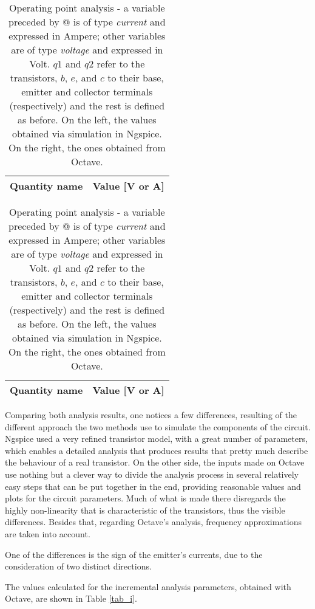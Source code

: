 \renewcommand{\arraystretch}{1.5}
\begin{table}[htbp]
\begin{minipage}{.3\textwidth}
\centering

\begin{tabular}{|c|c|}
\hline    
\textbf{Quantity name} & \textbf{Value [V or A]} \\ \hline

\end{tabular}
\end{minipage}
\hspace{50px}
\begin {minipage}{.8\textwidth}
\centering

\begin{tabular}{|c|c|}
\hline    
\textbf{Quantity name} & \textbf{Value [V or A]} \\ \hline

\end{tabular}
\end{minipage}
\caption{Operating point analysis - a variable preceded by @ is of type \textit{current} and expressed in Ampere; other variables are of type \textit {voltage} and expressed in Volt. $q1$ and $q2$ refer to the transistors, $b$, $e$, and $c$ to their base, emitter and collector terminals (respectively) and the rest is defined as before. On the left, the values obtained via simulation in Ngspice. On the right, the ones obtained from Octave. }
\label{tab_1}
\end{table}

\par Comparing both analysis results, one notices a few differences, resulting of the different approach the two methods use to simulate the components of the circuit. Ngspice used a very refined transistor model, with a great number of parameters, which enables a detailed analysis that produces results that pretty much describe the behaviour of a real transistor. On the other side, the inputs made on Octave use nothing but a clever way to divide the analysis process in several relatively easy steps that can be put together in the end, providing reasonable values and plots for the circuit parameters. Much of what is made there disregards the highly non-linearity that is characteristic of the transistors, thus the visible differences. Besides that, regarding Octave's analysis, frequency approximations are taken into account.
\par One of the differences is the sign of the emitter's currents, due to the consideration of two distinct directions. 
\par The values calculated for the incremental analysis parameters, obtained with Octave, are shown in Table \ref{tab_i}.

